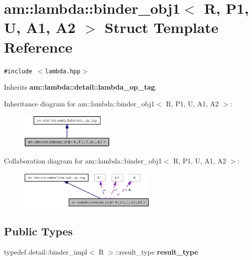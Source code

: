 \section{am::lambda::binder\_\-obj1$<$ R, P1, U, A1, A2 $>$ Struct Template Reference}
\label{structam_1_1lambda_1_1binder__obj1}
{\tt \#include $<$lambda.hpp$>$}

Inherits {\bf am::lambda::detail::lambda\_\-op\_\-tag}.

Inheritance diagram for am::lambda::binder\_\-obj1$<$ R, P1, U, A1, A2 $>$:\begin{figure}[H]
\begin{center}
\leavevmode
\includegraphics[width=131pt]{structam_1_1lambda_1_1binder__obj1__inherit__graph}
\end{center}
\end{figure}
Collaboration diagram for am::lambda::binder\_\-obj1$<$ R, P1, U, A1, A2 $>$:\begin{figure}[H]
\begin{center}
\leavevmode
\includegraphics[width=191pt]{structam_1_1lambda_1_1binder__obj1__coll__graph}
\end{center}
\end{figure}
\subsection*{Public Types}
\begin{CompactItemize}
\item 
typedef detail::binder\_\-impl$<$ R $>$::result\_\-type \textbf{result\_\-type}\label{structam_1_1lambda_1_1binder__obj1_1a5a45d79a37b7f1df97a51134ba2578}

\end{CompactItemize}
